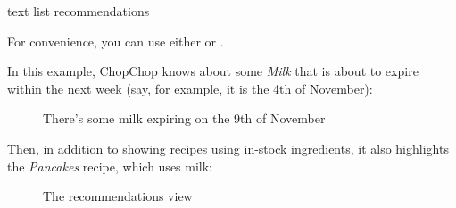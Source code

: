 	 \begin{blockofcode}{text}
		list recommendations
	\end{blockofcode}

	\begin{infobox}
		\bulb{} \hspace{.6em}\parbox{0.9\textwidth}{%
			 For convenience, you can use either  or .
		}
	\end{infobox}

	\pagebreak
	In this example, ChopChop knows about some \emph{Milk} that is about to expire within the next week (say, for example, it
	is the 4th of November):

	\begin{figure}[!htbp]\centering\ContinuedFloat*
		\caption{There's some milk expiring on the 9th of November}
	\end{figure}

	Then, in addition to showing recipes using in-stock ingredients, it also highlights the \emph{Pancakes} recipe,
	which uses milk:

	\begin{figure}[!htbp]\centering\ContinuedFloat
		\caption{The recommendations view}
	\end{figure}

